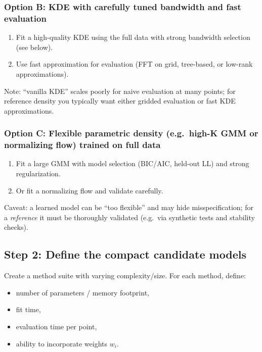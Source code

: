 \documentclass[twocolumn]{notes}
\begin{document}
\subsubsection{Option B: KDE with carefully tuned bandwidth and fast evaluation}
\begin{enumerate}[leftmargin=2em]
\item Fit a high-quality KDE using the full data with strong bandwidth selection (see below).
\item Use fast approximation for evaluation (FFT on grid, tree-based, or low-rank approximations).
\end{enumerate}
Note: ``vanilla KDE'' scales poorly for naive evaluation at many points; for reference density you typically want either gridded evaluation or fast KDE approximations.

\subsubsection{Option C: Flexible parametric density (e.g.\ high-K GMM or normalizing flow) trained on full data}
\begin{enumerate}[leftmargin=2em]
\item Fit a large GMM with model selection (BIC/AIC, held-out LL) and strong regularization.
\item Or fit a normalizing flow and validate carefully.
\end{enumerate}
Caveat: a learned model can be ``too flexible'' and may hide misspecification; for a \emph{reference} it must be thoroughly validated (e.g.\ via synthetic tests and stability checks).

\subsection{Step 2: Define the compact candidate models}
Create a method suite with varying complexity/size. For each method, define:
\begin{itemize}[leftmargin=2em]
\item number of parameters / memory footprint,
\item fit time,
\item evaluation time per point,
\item ability to incorporate weights $w_i$.
\end{itemize}
\end{document}
